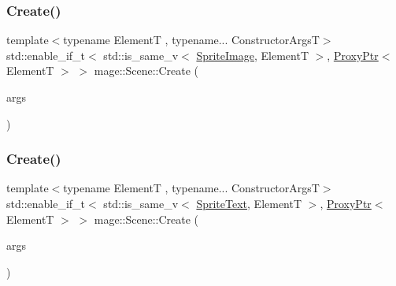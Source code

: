 \hypertarget{classmage_1_1_scene_a80e11f9f4424a0d250b1f83fe2caf275}{}\label{classmage_1_1_scene_a80e11f9f4424a0d250b1f83fe2caf275} 
\subsubsection{\texorpdfstring{Create()}{Create()}\hspace{0.1cm}{\footnotesize\ttfamily [9/11]}}
{\footnotesize\ttfamily template$<$typename ElementT , typename... Constructor\+ArgsT$>$ \\
std\+::enable\+\_\+if\+\_\+t$<$ std\+::is\+\_\+same\+\_\+v$<$ \hyperlink{classmage_1_1_sprite_image}{Sprite\+Image}, ElementT $>$, \hyperlink{classmage_1_1_proxy_ptr}{Proxy\+Ptr}$<$ ElementT $>$ $>$ mage\+::\+Scene\+::\+Create (\begin{DoxyParamCaption}\item[{Constructor\+ArgsT \&\&...}]{args }\end{DoxyParamCaption})}

\hypertarget{classmage_1_1_scene_a8c1fe27bd2930d8300265332631ec5c0}{}\label{classmage_1_1_scene_a8c1fe27bd2930d8300265332631ec5c0} 
\subsubsection{\texorpdfstring{Create()}{Create()}\hspace{0.1cm}{\footnotesize\ttfamily [10/11]}}
{\footnotesize\ttfamily template$<$typename ElementT , typename... Constructor\+ArgsT$>$ \\
std\+::enable\+\_\+if\+\_\+t$<$ std\+::is\+\_\+same\+\_\+v$<$ \hyperlink{classmage_1_1_sprite_text}{Sprite\+Text}, ElementT $>$, \hyperlink{classmage_1_1_proxy_ptr}{Proxy\+Ptr}$<$ ElementT $>$ $>$ mage\+::\+Scene\+::\+Create (\begin{DoxyParamCaption}\item[{Constructor\+ArgsT \&\&...}]{args }\end{DoxyParamCaption})}

\hypertarget{classmage_1_1_scene_ab135fe20ddadf6c1e2820a9582a31e64}{}\label{classmage_1_1_scene_ab135fe20ddadf6c1e2820a9582a31e64} 
